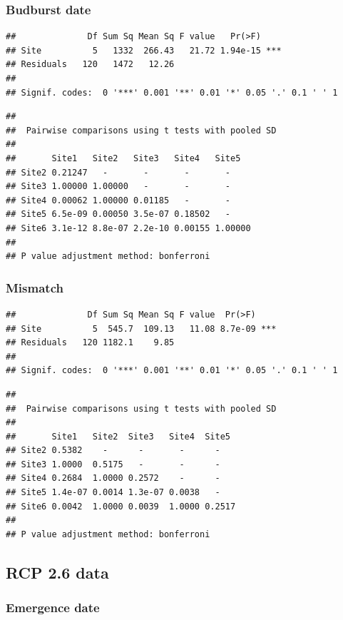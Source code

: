 \documentclass[12 pt]{article}
\begin{document}
\subsubsection*{Budburst date}

\begin{verbatim}
##              Df Sum Sq Mean Sq F value   Pr(>F)    
## Site          5   1332  266.43   21.72 1.94e-15 ***
## Residuals   120   1472   12.26                     
## 
## Signif. codes:  0 '***' 0.001 '**' 0.01 '*' 0.05 '.' 0.1 ' ' 1
\end{verbatim}

\begin{verbatim}
## 
##  Pairwise comparisons using t tests with pooled SD 
##  
##       Site1   Site2   Site3   Site4   Site5  
## Site2 0.21247   -       -       -       -      
## Site3 1.00000 1.00000   -       -       -      
## Site4 0.00062 1.00000 0.01185   -       -      
## Site5 6.5e-09 0.00050 3.5e-07 0.18502   -      
## Site6 3.1e-12 8.8e-07 2.2e-10 0.00155 1.00000
## 
## P value adjustment method: bonferroni
\end{verbatim}

\subsubsection*{Mismatch}

\begin{verbatim}
##              Df Sum Sq Mean Sq F value  Pr(>F)    
## Site          5  545.7  109.13   11.08 8.7e-09 ***
## Residuals   120 1182.1    9.85                    
## 
## Signif. codes:  0 '***' 0.001 '**' 0.01 '*' 0.05 '.' 0.1 ' ' 1
\end{verbatim}

\begin{verbatim}
## 
##  Pairwise comparisons using t tests with pooled SD 
## 
##       Site1   Site2  Site3   Site4  Site5 
## Site2 0.5382    -      -       -      -     
## Site3 1.0000  0.5175   -       -      -     
## Site4 0.2684  1.0000 0.2572    -      -     
## Site5 1.4e-07 0.0014 1.3e-07 0.0038   -     
## Site6 0.0042  1.0000 0.0039  1.0000 0.2517
## 
## P value adjustment method: bonferroni
\end{verbatim}

\subsection{RCP 2.6 data}
\subsubsection*{Emergence date}
\end{document}
